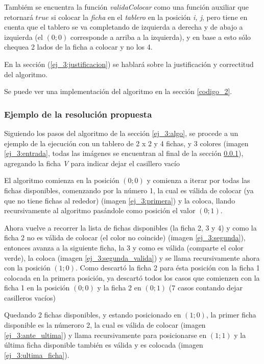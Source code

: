 Tambi\'em se encuentra la funci\'on \emph{validaColocar} como una funci\'on auxiliar que retornar\'a $true$ si colocar la \emph{ficha} en el \emph{tablero} en la posici\'on \emph{i, j},
pero tiene en cuenta que el tablero se va completando de izquierda a derecha y de abajo a izquierda (el $(0; 0)$ corresponde a arriba a la izquierda), y en base a esto s\'olo chequea 2 lados de la ficha a colocar y no los 4.

En la secci\'on (\ref{ej_3:justificacion}) se hablar\'a sobre la justificaci\'on y correctitud del algoritmo.

Se puede ver una implementaci\'on del algoritmo en la secci\'on \ref{codigo_2}.

\subsubsection{Ejemplo de la resoluci\'on propuesta}
\label{ej_3:ejemplo}

Siguiendo los pasos del algoritmo de la secci\'on \ref{ej_3:algo}, se procede a un ejemplo de la ejecuci\'on con un tablero de 2 x 2 y 4 fichas, y 3 colores (imagen \ref{ej_3:entrada}, todas las im\'agenes se encuentran al final de la secci\'on \ref{ej_3:ejemplo}), agregando la ficha \emph{V} para indicar dejar el casillero vac\'io

El algoritmo comienza en la posici\'on $(0;0)$ y comienza a iterar por todas las fichas disponibles, comenzando por la n\'umero 1, la cual es v\'alida de colocar (ya que no tiene fichas al rededor) (imagen \ref{ej_3:primera}) y la coloca, llando recursivamente al algoritmo pas\'andole como posici\'on el valor $(0;1)$.

Ahora vuelve a recorrer la lista de fichas disponibles (la ficha 2, 3 y 4) y como la ficha 2 no es v\'alida de colocar (el color no coincide) (imagen \ref{ej_3:segunda}), entonces avanza a la siguiente ficha, la 3 y como es v\'alida (comparte el color verde), la coloca (imagen \ref{ej_3:segunda_valida}) y se llama recursivamente ahora con la posici\'on $(1;0)$.
Como descart\'o la ficha 2 para \'esta posici\'on con la ficha 1 colocada en la primera posici\'on, ya descart\'o todos los casos que comienzen con la ficha 1 en la posici\'on $(0;0)$ y la ficha 2 en $(0;1)$ (7 casos contando dejar casilleros vac\'ios)

Quedando 2 fichas disponibles, y estando posicionado en $(1;0)$, la primer ficha disponible es la n\'umeroro 2, la cual es v\'alida de colocar (imagen \ref{ej_3:ante_ultima}) y llama recursivamente para posicionarse en $(1;1)$ y la \'ultima ficha disponible tambi\'en es v\'alida y es colocada (imagen \ref{ej_3:ultima_ficha}).

